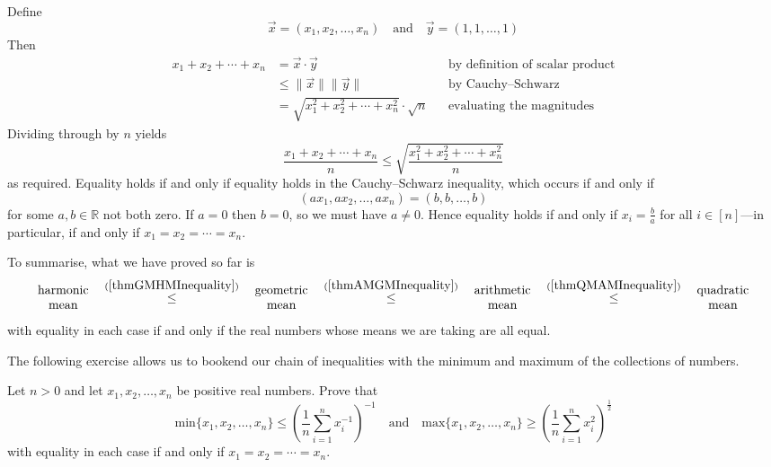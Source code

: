 \begin{cproof}
Define
\[ \vec x = (x_1,x_2,\dots,x_n) \quad \text{and} \quad \vec y = (1,1,\dots,1) \]
Then
\begin{align*}
x_1+x_2+\cdots+x_n
&= \vec x \cdot \vec y && \text{by definition of scalar product} \\
&\le \lVert \vec x \rVert \lVert \vec y \rVert && \text{by Cauchy--Schwarz} \\
&= \sqrt{x_1^2+x_2^2+\cdots+x_n^2} \cdot \sqrt{n} && \text{evaluating the magnitudes}
\end{align*}
Dividing through by $n$ yields
\[ \frac{x_1+x_2+\cdots+x_n}{n} \le \sqrt{\frac{x_1^2+x_2^2+\cdots+x_n^2}{n}} \]
as required. Equality holds if and only if equality holds in the Cauchy--Schwarz inequality, which occurs if and only if
\[ (ax_1,ax_2,\dots,ax_n)=(b,b,\dots,b) \]
for some $a,b \in \mathbb{R}$ not both zero. If $a=0$ then $b=0$, so we must have $a \ne 0$. Hence equality holds if and only if $x_i=\frac{b}{a}$ for all $i \in [n]$---in particular, if and only if $x_1=x_2=\cdots=x_n$.
\end{cproof}

To summarise, what we have proved so far is
\[ \begin{matrix} \text{harmonic} \\ \text{mean} \end{matrix} \quad \overset{(\ref{thmGMHMInequality})}{\le} \quad \begin{matrix} \text{geometric} \\ \text{mean} \end{matrix} \quad \overset{(\ref{thmAMGMInequality})}{\le} \quad \begin{matrix} \text{arithmetic} \\ \text{mean} \end{matrix} \quad \overset{(\ref{thmQMAMInequality})}{\le} \quad \begin{matrix} \text{quadratic} \\ \text{mean} \end{matrix} \]
with equality in each case if and only if the real numbers whose means we are taking are all equal.

The following exercise allows us to bookend our chain of inequalities with the minimum and maximum of the collections of numbers.

\begin{exercise}
\label{exMinMeanMaxInequalities}
Let $n > 0$ and let $x_1,x_2,\dots,x_n$ be positive real numbers. Prove that
\[ \mathrm{min} \{ x_1,x_2,\dots,x_n \} \le \left( \frac{1}{n} \sum_{i=1}^n x_i^{-1} \right)^{-1} \quad \text{and} \quad \mathrm{max} \{ x_1,x_2,\dots,x_n \} \ge \left( \frac{1}{n} \sum_{i=1}^n x_i^2 \right)^{\frac{1}{2}} \]
with equality in each case if and only if $x_1=x_2=\cdots=x_n$.
\end{exercise}

